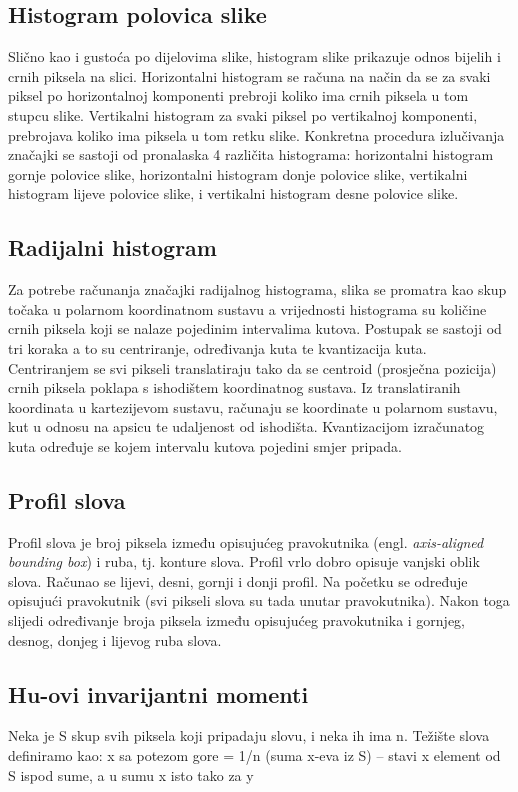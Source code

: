\documentclass[a4paper,twocolumn,dvipdfm]{article}
\begin{document}
\subsection{Histogram polovica slike}
Slično kao i gustoća po dijelovima slike, histogram slike prikazuje odnos 
bijelih i crnih piksela na slici. Horizontalni histogram se računa na način 
da se za svaki piksel po horizontalnoj komponenti prebroji koliko ima crnih 
piksela u tom stupcu slike. Vertikalni histogram za svaki piksel po vertikalnoj 
komponenti, prebrojava koliko ima piksela u tom retku slike. Konkretna 
procedura izlučivanja značajki se sastoji od pronalaska 4 različita histograma: 
horizontalni histogram gornje polovice slike, horizontalni histogram donje 
polovice slike, vertikalni histogram lijeve polovice slike, i vertikalni 
histogram desne polovice slike.

\subsection{Radijalni histogram}
Za potrebe računanja značajki radijalnog histograma, slika se promatra kao skup točaka u polarnom koordinatnom sustavu a vrijednosti histograma su količine crnih piksela koji se nalaze pojedinim intervalima kutova. Postupak se sastoji od tri koraka a to su centriranje, određivanja kuta te kvantizacija kuta. Centriranjem se svi pikseli translatiraju tako da se centroid (prosječna pozicija) crnih piksela poklapa s ishodištem koordinatnog sustava. Iz translatiranih koordinata u kartezijevom sustavu, računaju se koordinate u polarnom sustavu, kut u odnosu na apsicu te udaljenost od ishodišta. Kvantizacijom izračunatog kuta određuje se kojem intervalu kutova pojedini smjer pripada.

\subsection{Profil slova}
Profil slova je broj piksela između opisujućeg pravokutnika (engl. \emph{axis-aligned bounding box}) i ruba, tj. konture slova. Profil vrlo dobro opisuje vanjski oblik slova. Računao se lijevi, desni, gornji i donji profil. Na početku se određuje opisujući pravokutnik (svi pikseli slova su tada unutar pravokutnika). Nakon toga slijedi određivanje broja piksela između opisujućeg pravokutnika i gornjeg, desnog, donjeg i lijevog ruba slova. 

\subsection{Hu-ovi invarijantni momenti}
Neka je S skup svih piksela koji pripadaju slovu, i neka ih ima n.
Težište slova definiramo kao:
x sa potezom gore = 1/n (suma x-eva iz S) -- stavi x element od S ispod sume, a u sumu x
isto tako za y
\end{document}
